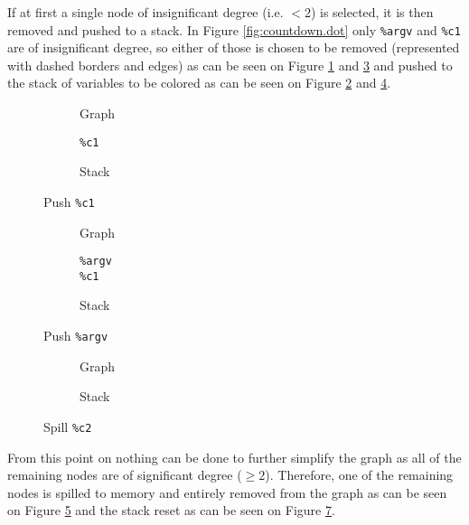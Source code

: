 \documentclass{article}
\begin{document}
If at first a single node of insignificant degree (i.e. \(< 2\)) is selected, it is then removed and pushed to a stack. In Figure \ref{fig:countdown.dot} only \texttt{\%argv} and \texttt{\%c1} are of insignificant degree, so either of those is chosen to be removed (represented with dashed borders and edges) as can be seen on Figure \ref{fig:countdown.dot2} and \ref{fig:countdown.dot3} and pushed to the stack of variables to be colored as can be seen on Figure \ref{fig:countdown.stack2} and \ref{fig:countdown.stack3}.




\begin{figure}[H]
  \centering
  \begin{minipage}[b]{0.31\linewidth}
    \begin{subfigure}[b]{0.70\textwidth}
      
      \caption{Graph}\label{fig:countdown.dot2}
    \end{subfigure}
    \begin{subfigure}[b]{0.27\textwidth}
      \centering
        \texttt{\%c1}
        \vspace{0.5em}
      \caption{Stack}\label{fig:countdown.stack2}
    \end{subfigure}
    \caption{Push \texttt{\%c1}}
  \end{minipage}%
  \begin{minipage}[b]{0.31\linewidth}
    \begin{subfigure}[b]{0.70\textwidth}
      
      \caption{Graph}\label{fig:countdown.dot3}
    \end{subfigure}
    \begin{subfigure}[b]{0.27\textwidth}
      \centering
        \texttt{\%argv}\\
        \texttt{\%c1}
        \vspace{0.5em}
      \caption{Stack}\label{fig:countdown.stack3}
    \end{subfigure}
    \caption{Push \texttt{\%argv}}
  \end{minipage}%
  \begin{minipage}[b]{0.31\linewidth}
    \begin{subfigure}[b]{0.70\textwidth}
      
      \caption{Graph}\label{fig:countdown.dot4}
    \end{subfigure}
    \begin{subfigure}[b]{0.27\textwidth}
      \caption{Stack}\label{fig:countdown.stack4}
    \end{subfigure}
    \caption{Spill \texttt{\%c2}}
  \end{minipage}%
\end{figure}
\noindent From this point on  nothing can be done to further simplify the graph as all of the remaining nodes are of significant degree (\(\geq 2\)). Therefore, one of the remaining nodes is spilled to memory and entirely removed from the graph as can be seen on Figure \ref{fig:countdown.dot4} and the stack reset as can be seen on Figure \ref{fig:countdown.stack4}.
\end{document}
